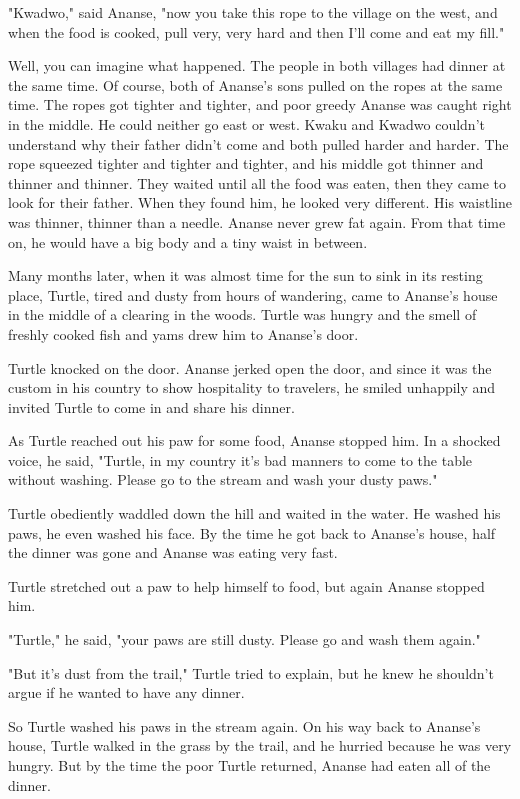 "Kwadwo," said Ananse, "now you take this rope to the village on the west, and when the food is cooked, pull very, very hard and then I'll come and eat my fill."

Well, you can imagine what happened. The people in both villages had dinner at the same time. Of course, both of Ananse's sons pulled on the ropes at the same time. The ropes got tighter and tighter, and poor greedy Ananse was caught right in the middle. He could neither go east or west. Kwaku and Kwadwo couldn't understand why their father didn't come and both pulled harder and harder. The rope squeezed tighter and tighter and tighter, and his middle got thinner and thinner and thinner. They waited until all the food was eaten, then they came to look for their father. When they found him, he looked very different. His waistline was thinner, thinner than a needle. Ananse never grew fat again. From that time on, he would have a big body and a tiny waist in between.

Many months later, when it was almost time for the sun to sink in its resting place, Turtle, tired and dusty from hours of wandering, came to Ananse's house in the middle of a clearing in the woods. Turtle was hungry and the smell of freshly cooked fish and yams drew him to Ananse's door.

Turtle knocked on the door. Ananse jerked open the door, and since it was the custom in his country to show hospitality to travelers, he smiled unhappily and invited Turtle to come in and share his dinner.

As Turtle reached out his paw for some food, Ananse stopped him. In a shocked voice, he said, "Turtle, in my country it's bad manners to come to the table without washing. Please go to the stream and wash your dusty paws."

Turtle obediently waddled down the hill and waited in the water. He washed his paws, he even washed his face. By the time he got back to Ananse's house, half the dinner was gone and Ananse was eating very fast.

Turtle stretched out a paw to help himself to food, but again Ananse stopped him.

"Turtle," he said, "your paws are still dusty. Please go and wash them again."

"But it's dust from the trail," Turtle tried to explain, but he knew he shouldn't argue if he wanted to have any dinner.

So Turtle washed his paws in the stream again. On his way back to Ananse's house, Turtle walked in the grass by the trail, and he hurried because he was very hungry. But by the time the poor Turtle returned, Ananse had eaten all of the dinner.

